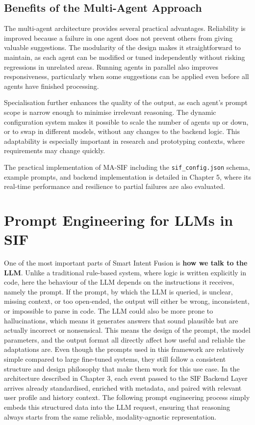\documentclass[openany]{book}
\begin{document}
\subsection{Benefits of the Multi-Agent Approach}
The multi-agent architecture provides several practical advantages. Reliability is improved because a failure in one agent does not prevent others from giving valuable suggestions. The modularity of the design makes it straightforward to maintain, as each agent can be modified or tuned independently without risking regressions in unrelated areas. Running agents in parallel also improves responsiveness, particularly when some suggestions can be applied even before all agents have finished processing.

Specialisation further enhances the quality of the output, as each agent’s prompt scope is narrow enough to minimise irrelevant reasoning. The dynamic configuration system makes it possible to scale the number of agents up or down, or to swap in different models, without any changes to the backend logic. This adaptability is especially important in research and prototyping contexts, where requirements may change quickly.

The practical implementation of MA-SIF including the \texttt{sif\_config.json} schema, example prompts, and backend implementation is detailed in Chapter 5, where its real-time performance and resilience to partial failures are also evaluated.

\section{Prompt Engineering for LLMs in SIF}
One of the most important parts of Smart Intent Fusion is \textbf{how we talk to the LLM}.
Unlike a traditional rule-based system, where logic is written explicitly in code, here the behaviour of the LLM depends on the instructions it receives, namely the prompt.
If the prompt, by which the LLM is queried, is unclear, missing context, or too open-ended, the output will either be wrong, inconsistent, or impossible to parse in code.
The LLM could also be more prone to hallucinations, which means it generates answers that sound plausible but are actually incorrect or nonsensical. This means the design of the prompt, the model parameters, and the output format all directly affect how useful and reliable the adaptations are. Even though the prompts used in this framework are relatively simple compared to large fine-tuned systems, they still follow a consistent structure and design philosophy that make them work for this use case. In the architecture described in Chapter 3, each event passed to the SIF Backend Layer arrives already standardised, enriched with metadata, and paired with relevant user profile and history context. The following prompt engineering process simply embeds this structured data into the LLM request, ensuring that reasoning always starts from the same reliable, modality-agnostic representation.
\end{document}

